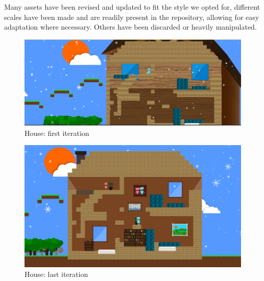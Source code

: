 \documentclass[a4paper,twoside,12pt]{article}
\begin{document}
Many assets have been revised and updated to fit the style we opted for, different scales have been made and are readily present in the repository, allowing for easy adaptation where necessary. Others have been discarded or heavily manipulated.
\begin{figure}[H]
  \includegraphics[width=1\textwidth]{house_1}
  \caption{House: first iteration}
\end{figure}
\begin{figure}[H]
  \includegraphics[width=1\textwidth]{house_2}
  \caption{House: last iteration} 
\end{figure}
\end{document}
